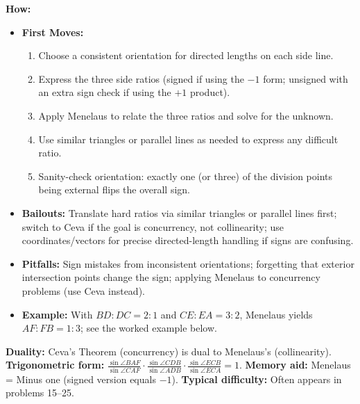 \documentclass[12pt]{article}
\begin{document}
\textbf{How:}
\begin{itemize}
    \item \textbf{First Moves:}
    \begin{enumerate}[nosep]
        \item Choose a consistent orientation for directed lengths on each side line.
        \item Express the three side ratios (signed if using the $-1$ form; unsigned with an extra sign check if using the $+1$ product).
        \item Apply Menelaus to relate the three ratios and solve for the unknown.
        \item Use similar triangles or parallel lines as needed to express any difficult ratio.
        \item Sanity-check orientation: exactly one (or three) of the division points being external flips the overall sign.
    \end{enumerate}
    \item \textbf{Bailouts:} Translate hard ratios via similar triangles or parallel lines first; switch to Ceva if the goal is concurrency, not collinearity; use coordinates/vectors for precise directed-length handling if signs are confusing.
    \item \textbf{Pitfalls:} Sign mistakes from inconsistent orientations; forgetting that exterior intersection points change the sign; applying Menelaus to concurrency problems (use Ceva instead).
    \item \textbf{Example:} With $BD:DC=2:1$ and $CE:EA=3:2$, Menelaus yields $AF:FB=1:3$; see the worked example below.
\end{itemize}
\textbf{Duality:} Ceva's Theorem (concurrency) is dual to Menelaus's (collinearity).
\textbf{Trigonometric form:} $\displaystyle \frac{\sin \angle BAF}{\sin \angle CAF}\cdot\frac{\sin \angle CDB}{\sin \angle ADB}\cdot\frac{\sin \angle ECB}{\sin \angle ECA} = 1$.
\textbf{Memory aid:} Menelaus = Minus one (signed version equals $-1$).
\textbf{Typical difficulty:} Often appears in problems 15--25.

\begin{center}
\end{center}
\end{document}
